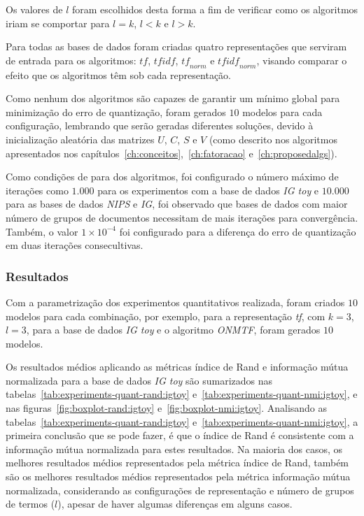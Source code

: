 \documentclass[
    12pt,                %
    oneside,            %
    a4paper,            %
    english,            %
    brazil                %
    ]{abntex2ppgsi}
\begin{document}
Os valores de $l$ foram escolhidos desta forma a fim de verificar como os algoritmos iriam se comportar para $l = k$, $l < k$ e $l > k$.

Para todas as bases de dados foram criadas quatro representações que serviram de entrada para os algoritmos: $\textit{tf}$, $\textit{tfidf}$, $\textit{tf}_{norm}$ e $\textit{tfidf}_{norm}$, visando comparar o efeito que os algoritmos têm sob cada representação.

Como nenhum dos algoritmos são capazes de garantir um mínimo global para minimização do erro de quantização, foram gerados $10$ modelos para cada configuração, lembrando que serão geradas diferentes soluções, devido à inicialização aleatória das matrizes $U$, $C$, $S$ e $V$ (como descrito nos algoritmos apresentados nos capítulos~\ref{ch:conceitos},~\ref{ch:fatoracao} e~\ref{ch:proposedalgs}).

Como condições de para dos algoritmos, foi configurado o número máximo de iterações como $1.000$ para os experimentos com a base de dados \textit{IG toy} e $10.000$ para as bases de dados \textit{NIPS} e \textit{IG}, foi observado que bases de dados com maior número de grupos de documentos necessitam de mais iterações para convergência.
Também, o valor $1 \times 10^{-4}$ foi configurado para a diferença do erro de quantização em duas iterações consecultivas.

\subsubsection{Resultados}
\label{subsec:experiments-quant:results}

Com a parametrização dos experimentos quantitativos realizada, foram criados $10$ modelos para cada combinação, por exemplo, para a representação \textit{tf}, com $k = 3$, $l = 3$, para a base de dados \textit{IG toy} e o algoritmo \textit{ONMTF}, foram gerados $10$ modelos.

Os resultados médios aplicando as métricas índice de Rand e informação mútua normalizada para a base de dados \textit{IG toy} são sumarizados nas tabelas~\ref{tab:experiments-quant-rand:igtoy} e~\ref{tab:experiments-quant-nmi:igtoy}, e nas figuras~\ref{fig:boxplot-rand:igtoy} e~\ref{fig:boxplot-nmi:igtoy}.
Analisando as tabelas~\ref{tab:experiments-quant-rand:igtoy} e~\ref{tab:experiments-quant-nmi:igtoy}, a primeira conclusão que se pode fazer, é que o índice de Rand é consistente com a informação mútua normalizada para estes resultados.
Na maioria dos casos, os melhores resultados médios representados pela métrica índice de Rand, também são os melhores resultados médios representados pela métrica informação mútua normalizada, considerando as configurações de representação e número de grupos de termos ($l$), apesar de haver algumas diferenças em alguns casos.
\end{document}
